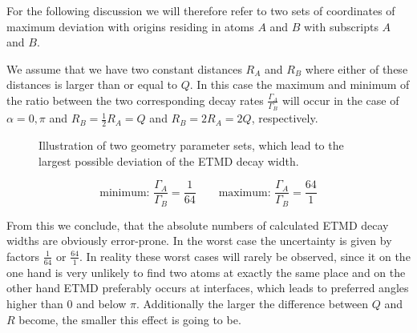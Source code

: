 For the following discussion we will therefore refer to two sets
of coordinates of maximum deviation with origins residing in atoms
$A$ and $B$ with subscripts $A$ and $B$.

We assume that we have two constant distances $R_{A}$ and $R_B$
where either of these distances is larger than or equal to $Q$.
In this case the maximum and minimum of the ratio between the two
corresponding decay rates $\frac{\Gamma_{A}}{\Gamma_B}$ will occur
in the case of $\alpha = 0,\pi$ and $R_B = \frac 12 R_{A} = Q$
and $R_B = 2 R_{A} = 2Q$, respectively.

\begin{figure}[h]
 \centering
 
 \caption{Illustration of two geometry parameter sets, which lead
          to the largest possible deviation of the ETMD decay width.}
 \label{}
\end{figure}

\begin{equation}
\text{minimum: } \frac{\Gamma_{A}}{\Gamma_B}= \frac{1}{64} \quad\quad
\text{maximum: } \frac{\Gamma_{A}}{\Gamma_B}= \frac{64}{1}
\end{equation}

From this we conclude, that the absolute numbers of calculated ETMD
decay widths are obviously error-prone. In the worst case the uncertainty
is given by factors $\frac{1}{64}$ or $\frac{64}{1}$.
In reality these worst cases will rarely be observed, since it on
the one hand is very unlikely to find two atoms at exactly the same place
and on the other hand ETMD preferably occurs at interfaces, which leads
to preferred angles higher than 0 and below $\pi$.
Additionally the larger the difference between $Q$ and $R$ become, the
smaller this effect is going to be.


